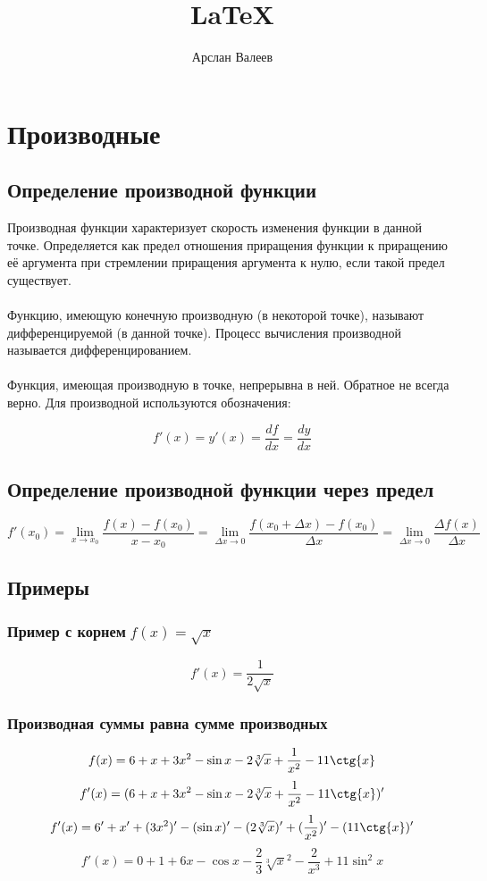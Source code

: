 \documentclass[12pt,a4paper]{article}
\title{\LaTeX}
\date{}
\author{Арслан Валеев}
\begin{document}
  

\section{Производные}
\subsection{Определение производной функции}

Производная функции характеризует скорость изменения функции в данной точке. Определяется как предел отношения приращения функции к приращению её аргумента при стремлении приращения аргумента к нулю, если такой предел существует.
\\\\
Функцию, имеющую конечную производную (в некоторой точке), называют дифференцируемой (в данной точке). Процесс вычисления производной называется дифференцированием.
\\\\
Функция, имеющая производную в точке, непрерывна в ней. Обратное не всегда верно.
Для производной используются обозначения:

$$f'(x)=y'(x)=\frac{df}{dx}=\frac{dy}{dx}$$

\subsection{Определение производной функции через предел}

$$f'(x_0)
= \lim_{x \to x_0}\frac{f(x)-f(x_0)}{x-x_0}
= \lim_{\Delta x \to 0}\frac{f(x_0+ \Delta x)-f(x_0)}{\Delta x}
= \lim_{\Delta x \to 0}\frac{\Delta f(x)}{\Delta x}
$$

\subsection{Примеры}

\subsubsection{Пример с корнем$\;f(x)=\sqrt{x}$}
$$f'(x)=\frac{1}{2\sqrt{x}}$$
\subsubsection{Производная суммы равна сумме производных}
$$f(x)=6+x+3x^2-\sin{x}-2\sqrt[3]{x}+\frac{1}{x^2}-11\ctg{x}$$
$$f'(x)=(6+x+3x^2-\sin{x}-2\sqrt[3]{x}+\frac{1}{x^2}-11\ctg{x})'$$
$$f'(x)= 6'+x'+(3x^2)'-(\sin{x})'-(2\sqrt[3]{x})'+(\frac{1}{x^2})'-(11\ctg{x})'$$
$$f'(x)= 0+1+6x-\cos{x}-\frac{2}{3}\sqrt[3]x^2-\frac{2}{x^3}+11\sin^2{x}$$
\end{document}
